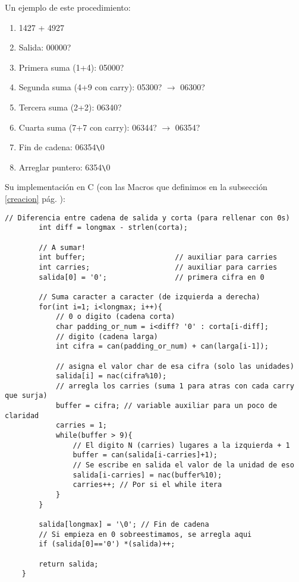 \documentclass[a4paper, 12pt]{article}
\begin{document}
Un ejemplo de este procedimiento:

\begin{enumerate}
    \item 1427 + 4927
    \item Salida: 00000?
    \item Primera suma (1+4): 05000?
    \item Segunda suma (4+9 con carry): 05300? $\to$ 06300?
    \item Tercera suma (2+2): 06340?
    \item Cuarta suma (7+7 con carry): 06344? $\to$ 06354?
    \item Fin de cadena: 06354\verb|\|0
    \item Arreglar puntero: 6354\verb|\|0
\end{enumerate}

Su implementación en C (con las Macros que definimos en la subsección \ref{creacion}  pág. \pageref{macros-can-nac}):

\begin{lstlisting}[style=C]
    // Diferencia entre cadena de salida y corta (para rellenar con 0s)
        int diff = longmax - strlen(corta);
    
        // A sumar!
        int buffer;                     // auxiliar para carries
        int carries;                    // auxiliar para carries
        salida[0] = '0';                // primera cifra en 0
        
        // Suma caracter a caracter (de izquierda a derecha)
        for(int i=1; i<longmax; i++){
            // 0 o digito (cadena corta)
            char padding_or_num = i<diff? '0' : corta[i-diff];
            // digito (cadena larga)
            int cifra = can(padding_or_num) + can(larga[i-1]);
    
            // asigna el valor char de esa cifra (solo las unidades)
            salida[i] = nac(cifra%10);
            // arregla los carries (suma 1 para atras con cada carry que surja)
            buffer = cifra; // variable auxiliar para un poco de claridad
            carries = 1;
            while(buffer > 9){
                // El digito N (carries) lugares a la izquierda + 1
                buffer = can(salida[i-carries]+1);
                // Se escribe en salida el valor de la unidad de eso
                salida[i-carries] = nac(buffer%10);
                carries++; // Por si el while itera
            }
        }
        
        salida[longmax] = '\0'; // Fin de cadena
        // Si empieza en 0 sobreestimamos, se arregla aqui
        if (salida[0]=='0') *(salida)++;
    
        return salida;
    }
\end{lstlisting}
\end{document}
